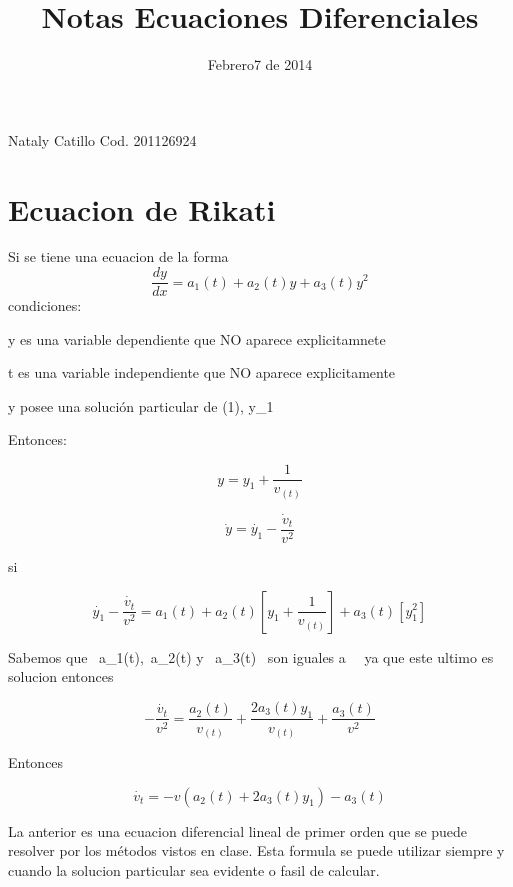 \documentclass{article}
\title{Notas Ecuaciones Diferenciales}
\begin{document}
\date{Febrero7 de 2014}
\maketitle
Nataly Catillo 
Cod.  201126924
 
\section{Ecuacion de Rikati}

Si se tiene una ecuacion de la forma
\begin{equation}
  \frac{dy}{dx}= a_{1}(t)+a_{2}(t)y+a_{3}(t)y^{2}
\end{equation}
condiciones:

 y es una variable dependiente que NO aparece explicitamnete 


 t es una variable independiente que NO aparece explicitamente 

y posee una soluci\'on particular de (1),  y_{1} 

 Entonces: 

\begin{equation}
 y=y_{1}+\frac{1}{v_{(t)}}
\end{equation}

\begin{equation}
  \dot{y}=\dot{y_{1}}-\frac{\dot{v}_{t}}{v^{2}} 
\end{equation}

si

 
\begin{equation}
 \dot{y_{1}}-\frac{\dot{v_{t}}}{v^{2}}=a_{1}(t)+a_{2}(t)[y_{1}+\frac{1}{v_{(t)}}]+a_{3}(t)[y^{2}_{1}]
\end{equation}


Sabemos que  \ a_{1}(t),\ a_{2}(t) y \ a_{3}(t) \ son iguales  a  \ \ ya  que este ultimo es solucion entonces 


\begin{equation}
 -\frac{\dot{v_{t}}}{v^{2}}=\frac{a_{2}(t)}{v_{(t)}}+\frac{2a_{3}(t)y_{1}}{v_{(t)}}+\frac{a_{3}(t)}{v^{2}}
\end{equation}

Entonces 

\begin{equation}
 \dot{v_{t}}=-v(a_{2}(t)+2a_{3}(t)y_{1})-a_{3}(t)
\end{equation}


La anterior es una ecuacion diferencial lineal de primer orden que se  puede  resolver por los  m\'etodos  vistos en clase. Esta formula se  puede utilizar siempre y cuando la solucion particular sea evidente o fasil de calcular.
\end{document}
